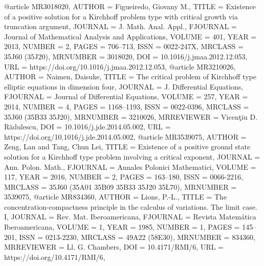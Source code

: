 @article {MR3018020,
    AUTHOR = {Figueiredo, Giovany M.},
     TITLE = {Existence of a positive solution for a {K}irchhoff problem
              type with critical growth via truncation argument},
   JOURNAL = {J. Math. Anal. Appl.},
  FJOURNAL = {Journal of Mathematical Analysis and Applications},
    VOLUME = {401},
      YEAR = {2013},
    NUMBER = {2},
     PAGES = {706--713},
      ISSN = {0022-247X},
   MRCLASS = {35J60 (35J20)},
  MRNUMBER = {3018020},
       DOI = {10.1016/j.jmaa.2012.12.053},
       URL = {https://doi.org/10.1016/j.jmaa.2012.12.053},
}
@article {MR3210026,
    AUTHOR = {Naimen, Daisuke},
     TITLE = {The critical problem of {K}irchhoff type elliptic equations in
              dimension four},
   JOURNAL = {J. Differential Equations},
  FJOURNAL = {Journal of Differential Equations},
    VOLUME = {257},
      YEAR = {2014},
    NUMBER = {4},
     PAGES = {1168--1193},
      ISSN = {0022-0396},
   MRCLASS = {35J60 (35B33 35J20)},
  MRNUMBER = {3210026},
MRREVIEWER = {Vicen\c{t}iu D. R\u{a}dulescu},
       DOI = {10.1016/j.jde.2014.05.002},
       URL = {https://doi.org/10.1016/j.jde.2014.05.002},
}
@article {MR3539075,
    AUTHOR = {Zeng, Lan and Tang, Chun Lei},
     TITLE = {Existence of a positive ground state solution for a
              {K}irchhoff type problem involving a critical exponent},
   JOURNAL = {Ann. Polon. Math.},
  FJOURNAL = {Annales Polonici Mathematici},
    VOLUME = {117},
      YEAR = {2016},
    NUMBER = {2},
     PAGES = {163--180},
      ISSN = {0066-2216},
   MRCLASS = {35J60 (35A01 35B09 35B33 35J20 35L70)},
  MRNUMBER = {3539075},
}
@article {MR834360,
    AUTHOR = {Lions, P.-L.},
     TITLE = {The concentration-compactness principle in the calculus of
              variations. {T}he limit case. {I}},
   JOURNAL = {Rev. Mat. Iberoamericana},
  FJOURNAL = {Revista Matem\'{a}tica Iberoamericana},
    VOLUME = {1},
      YEAR = {1985},
    NUMBER = {1},
     PAGES = {145--201},
      ISSN = {0213-2230},
   MRCLASS = {49A22 (58E30)},
  MRNUMBER = {834360},
MRREVIEWER = {Ll. G. Chambers},
       DOI = {10.4171/RMI/6},
       URL = {https://doi.org/10.4171/RMI/6},
}